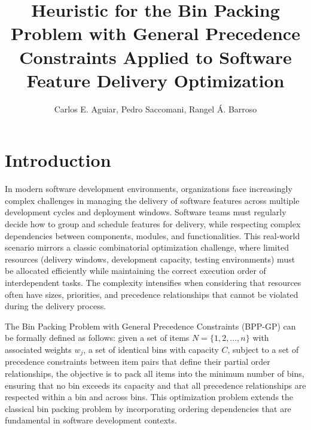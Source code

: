 \documentclass[12pt]{article}
\title{Heuristic for the Bin Packing Problem with General Precedence Constraints Applied to Software Feature Delivery Optimization}
\author{Carlos E. Aguiar\inst{1}, Pedro Saccomani\inst{1}, Rangel Á. Barroso\inst{1} }
\begin{document}
 

\maketitle

     


\section{Introduction}
In modern software development environments, organizations face increasingly complex challenges in managing the delivery of software features across multiple development cycles and deployment windows. Software teams must regularly decide how to group and schedule features for delivery, while respecting complex dependencies between components, modules, and functionalities. This real-world scenario mirrors a classic combinatorial optimization challenge, where limited resources (delivery windows, development capacity, testing environments) must be allocated efficiently while maintaining the correct execution order of interdependent tasks. The complexity intensifies when considering that resources often have sizes, priorities, and precedence relationships that cannot be violated during the delivery process.

The Bin Packing Problem with General Precedence Constraints (BPP-GP) can be formally defined as follows: given a set of items $N = \{1,2,...,n\}$ with associated weights $w_j$, a set of identical bins with capacity $C$, subject to a set of precedence constraints between item pairs that define their partial order relationships, the objective is to pack all items into the minimum number of bins, ensuring that no bin exceeds its capacity and that all precedence relationships are respected within a bin and across bins. This optimization problem extends the classical bin packing problem by incorporating ordering dependencies that are fundamental in software development contexts.
\end{document}
